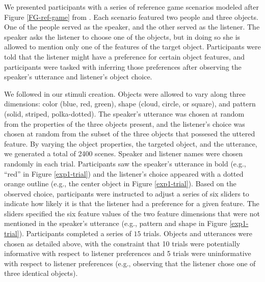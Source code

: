 \documentclass[10pt,a4paper]{article}
\begin{document}
We presented participants with a series of reference game scenarios modeled after Figure \ref{FG-ref-game} from . Each scenario featured two people and three objects. One of the people served as the speaker, and the other served as the listener. The speaker asks the listener to choose one of the objects, but in doing so she is allowed to mention only one of the features of the target object. Participants were told that the listener might have a preference for certain object features, and participants were tasked with inferring those preferences after observing the speaker's utterance and listener's object choice.

We followed  in our stimuli creation. Objects were allowed to vary along three dimensions: color (blue, red, green), shape (cloud, circle, or square), and pattern (solid, striped, polka-dotted). The speaker's utterance was chosen at random from the properties of the three objects present, and the listener's choice was chosen at random from the subset of the three objects that possesed the uttered feature. By varying the object properties, the targeted object, and the utterance, we generated a total of 2400 scenes. Speaker and listener names were chosen randomly in each trial. Participants saw the speaker's utterance in bold (e.g., ``red'' in Figure \ref{exp1-trial}) and the listener's choice appeared with a dotted orange outline (e.g., the center object in Figure \ref{exp1-trial}). Based on the observed choice, participants were instructed to adjust a series of six sliders to indicate how likely it is that the listener had a preference for a given feature. The sliders specified the six feature values of the two feature dimensions that were not mentioned in the speaker's utterance (e.g., pattern and shape in Figure \ref{exp1-trial}). Participants completed a series of $15$ trials. Objects and utterances were chosen as detailed above, with the constraint that 10 trials were potentially informative with respect to listener preferences and 5 trials were uninformative with respect to listener preferences (e.g., observing that the listener chose one of three identical objects). 

\end{document}

